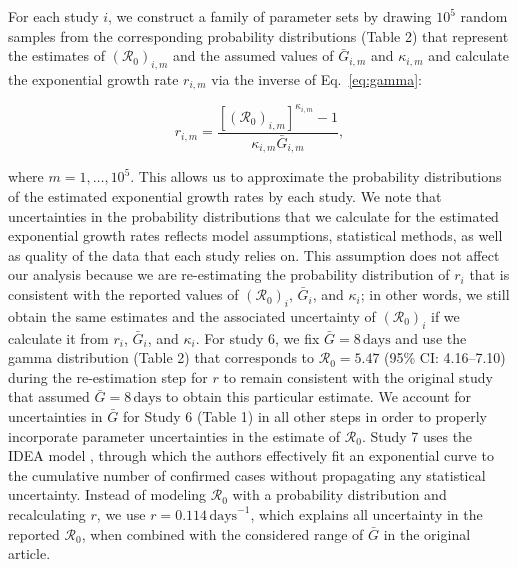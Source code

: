 \documentclass[12pt]{article}
\newcommand{\eref}[1]{Eq.~\ref{eq:#1}}
\newcommand{\Ro}{\ensuremath{{\mathcal R}_{0}}\xspace}
\begin{document}
For each study $i$, we construct a family of parameter sets by drawing $10^5$ random samples from the corresponding probability distributions (Table 2) that represent the estimates of $(\Ro)_{i,m}$ and the assumed values of $\bar G_{i,m}$ and $\kappa_{i,m}$ and calculate the exponential growth rate $r_{i,m}$ via the inverse of \eref{gamma}:
\begin{linenomath*}
\begin{equation}
r_{i,m} = \frac{\left[(\Ro)_{i,m}\right]^{\kappa_{i,m}} - 1}{\kappa_{i,m} \bar{G}_{i,m}},
\end{equation}
\end{linenomath*}
where $m=1,\dots,10^5$.
This allows us to approximate the probability distributions of the estimated exponential growth rates by each study.
We note that uncertainties in the probability distributions that we calculate for the estimated exponential growth rates reflects model assumptions, statistical methods, as well as quality of the data that each study relies on.
This assumption does not affect our analysis because we are re-estimating the probability distribution of $r_i$ that is consistent with the reported values of $(\Ro)_i$, $\bar G_i$, and $\kappa_i$;
in other words, we still obtain the same estimates and the associated uncertainty of $(\Ro)_i$ if we calculate it from $r_i$, $\bar G_i$, and $\kappa_i$.
For study 6, we fix $\bar G=8\,\textrm{days}$ and use the gamma distribution (Table 2) that corresponds to $\mathcal R_0 = 5.47$ (95\% CI: 4.16--7.10) during the re-estimation step for $r$ to remain consistent with the original study that assumed $\bar G=8\,\textrm{days}$ to obtain this particular estimate.
We account for uncertainties in $\bar G$ for Study 6 (Table 1) in all other steps in order to properly incorporate parameter uncertainties in the estimate of \Ro.
Study 7 uses the IDEA model \citep{fisman2013idea}, through which the authors effectively fit an exponential curve to the cumulative number of confirmed cases without propagating any statistical uncertainty.
Instead of modeling \Ro with a probability distribution and recalculating $r$, we use $r=0.114\,\mathrm{days}^{-1}$, which explains all uncertainty in the reported \Ro, when combined with the considered range of $\bar G$ in the original article.
\end{document}
